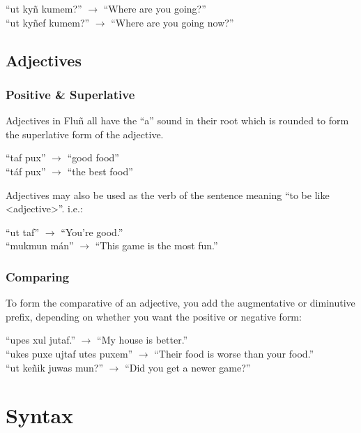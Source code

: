 \documentclass{book}
\begin{document}
\begin{center}
    ``ut kyñ kumem?'' $\rightarrow$ ``Where are you going?'' \\
    ``ut kyñef kumem?'' $\rightarrow$ ``Where are you going now?''
\end{center}


\section{Adjectives}
\subsection{Positive \& Superlative}
Adjectives in Fluñ all have the ``a'' sound in their root which is rounded to form the superlative
form of the adjective.

\begin{center}
    ``taf pux'' $\rightarrow$ ``good food'' \\
    ``táf pux'' $\rightarrow$ ``the best food''
\end{center}

Adjectives may also be used as the verb of the sentence meaning ``to be like <adjective>''. i.e.:

\begin{center}
    ``ut taf'' $\rightarrow$ ``You're good.'' \\
    ``mukmun mán'' $\rightarrow$ ``This game is the most fun.''
\end{center}

\subsection{Comparing}
To form the comparative of an adjective, you add the augmentative or diminutive prefix, depending
on whether you want the positive or negative form:

\begin{center}
    ``upes xul jutaf.'' $\rightarrow$ ``My house is better.'' \\
    ``ukes puxe ujtaf utes puxem'' $\rightarrow$ ``Their food is worse than your food.'' \\
    ``ut keñik juwas mun?'' $\rightarrow$ ``Did you get a newer game?''
\end{center}


\chapter{Syntax}
\end{document}
